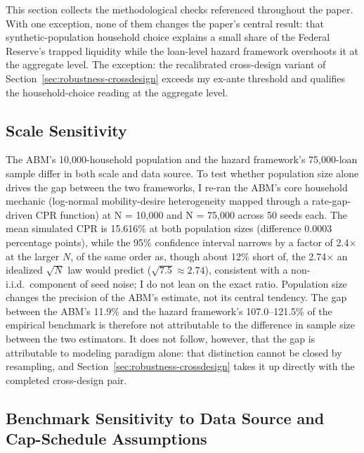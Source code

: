 \documentclass[12pt]{article}
\begin{document}
This section collects the methodological checks referenced throughout the paper. With one exception, none of them changes the paper's central result: that synthetic-population household choice explains a small share of the Federal Reserve's trapped liquidity while the loan-level hazard framework overshoots it at the aggregate level. The exception: the recalibrated cross-design variant of Section~\ref{sec:robustness-crossdesign} exceeds my ex-ante threshold and qualifies the household-choice reading at the aggregate level.

\subsection{Scale Sensitivity}\label{sec:robustness-scale}

The ABM's 10,000-household population and the hazard framework's 75,000-loan sample differ in both scale and data source. To test whether population size alone drives the gap between the two frameworks, I re-ran the ABM's core household mechanic (log-normal mobility-desire heterogeneity mapped through a rate-gap-driven CPR function) at N = 10,000 and N = 75,000 across 50 seeds each. The mean simulated CPR is 15.616\% at both population sizes (difference 0.0003 percentage points), while the 95\% confidence interval narrows by a factor of 2.4$\times$ at the larger $N$, of the same order as, though about 12\% short of, the 2.74$\times$ an idealized $\sqrt{N}$ law would predict ($\sqrt{7.5} \approx 2.74$), consistent with a non-i.i.d.\ component of seed noise; I do not lean on the exact ratio. Population size changes the precision of the ABM's estimate, not its central tendency. The gap between the ABM's 11.9\% and the hazard framework's 107.0--121.5\% of the empirical benchmark is therefore not attributable to the difference in sample size between the two estimators. It does not follow, however, that the gap is attributable to modeling paradigm alone: that distinction cannot be closed by resampling, and Section~\ref{sec:robustness-crossdesign} takes it up directly with the completed cross-design pair.

\subsection{Benchmark Sensitivity to Data Source and Cap-Schedule Assumptions}\label{sec:robustness-benchmark}
\end{document}
